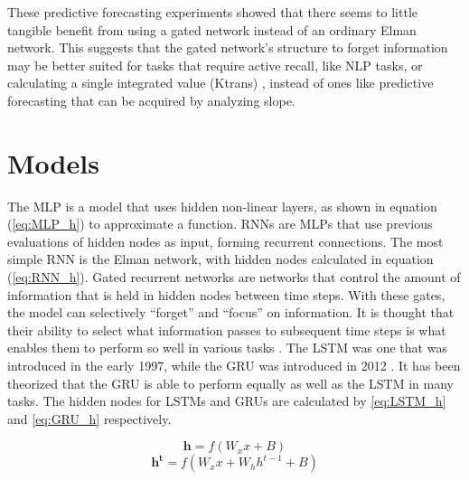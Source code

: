 \documentclass[11pt]{article}
\begin{document}
These predictive forecasting experiments showed that there seems to
little tangible benefit from using a gated network instead of an
ordinary Elman network. This suggests that
the gated network's structure to forget information may be
better suited for tasks that require active recall, like NLP tasks, or
calculating a single integrated value (Ktrans) , instead of ones like
predictive forecasting that can be acquired by analyzing slope. %

\section{Models}
The MLP is a model that uses hidden non-linear
layers, as shown in equation (\ref{eq:MLP_h})
to approximate a function. RNNs are MLPs that use previous evaluations
of hidden nodes as input, forming recurrent connections. The most
simple RNN is the Elman network, with hidden nodes calculated in
equation (\ref{eq:RNN_h}).
Gated recurrent networks are networks that control the
amount of information that is held in hidden nodes between time
steps. With these gates, the model can selectively ``forget''
and ``focus'' on information. It is thought that their ability to select what information
passes to subsequent time steps is what enables them to perform so
well in various tasks \cite{LSTM}. The LSTM was one that was introduced in the early
1997, while the GRU was introduced in 2012 \cite{GRU}. It has been theorized
that the GRU is able to perform equally as well as the LSTM in many tasks. 
The hidden nodes for
LSTMs and GRUs are calculated by \ref{eq:LSTM_h} and \ref{eq:GRU_h}
respectively.

\begin{equation}
\mathbf{h} = f( W_xx+B)
\label{eq:MLP_h}
\end{equation}
\begin{equation}
\mathbf{h^t} = f(W_xx+W_hh^{t-1}+B)
\label{eq:RNN_h}
\end{equation}
\end{document}
